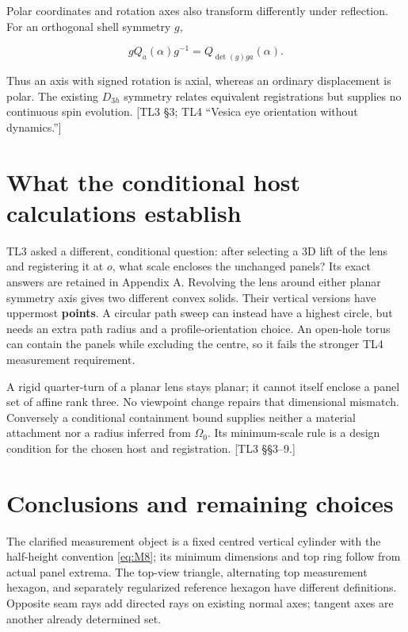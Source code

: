 \documentclass[11pt,a4paper]{article}
\begin{document}
Polar coordinates and rotation axes also transform differently under reflection. For an orthogonal shell symmetry \(g\),

\[
gQ_a(\alpha)g^{-1}=Q_{\det(g)ga}(\alpha).
\tag{M38}\label{eq:M38}
\]

Thus an axis with signed rotation is axial, whereas an ordinary displacement is polar. The existing \(D_{3h}\) symmetry relates equivalent registrations but supplies no continuous spin evolution. [TL3 \S{}3; TL4 \textquotedblleft{}Vesica eye orientation without dynamics.\textquotedblright{}]

\section{What the conditional host calculations establish}

TL3 asked a different, conditional question: after selecting a 3D lift of the lens and registering it at \(o\), what scale encloses the unchanged panels? Its exact answers are retained in Appendix A. Revolving the lens around either planar symmetry axis gives two different convex solids. Their vertical versions have uppermost \textbf{points}. A circular path sweep can instead have a highest circle, but needs an extra path radius and a profile-orientation choice. An open-hole torus can contain the panels while excluding the centre, so it fails the stronger TL4 measurement requirement.

A rigid quarter-turn of a planar lens stays planar; it cannot itself enclose a panel set of affine rank three. No viewpoint change repairs that dimensional mismatch. Conversely a conditional containment bound supplies neither a material attachment nor a radius inferred from \(\Omega_0\). Its minimum-scale rule is a design condition for the chosen host and registration. [TL3 \S{}\S{}3--9.]

\section{Conclusions and remaining choices}

The clarified measurement object is a fixed centred vertical cylinder with the half-height convention \eqref{eq:M8}; its minimum dimensions and top ring follow from actual panel extrema. The top-view triangle, alternating top measurement hexagon, and separately regularized reference hexagon have different definitions. Opposite seam rays add directed rays on existing normal axes; tangent axes are another already determined set.
\end{document}
